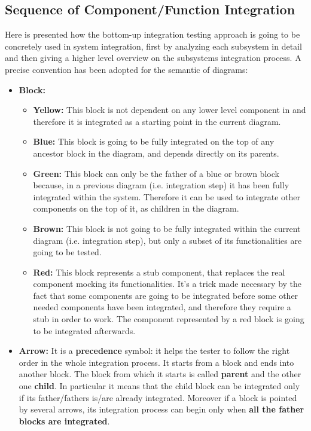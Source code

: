 \subsection{Sequence of Component/Function Integration}
Here is presented how the bottom-up integration testing approach is going to be concretely used in \myTaxiService{} system integration, first by analyzing each subsystem in detail and then giving a higher level overview on the subsystems integration process.
A precise convention has been adopted for the semantic of diagrams:
\begin{itemize}
	\item
		\textbf{Block:}
		\begin{itemize}
			\item \textbf{Yellow:} This block is not dependent on any lower level component in \myTaxiService{} and therefore it is integrated as a starting point in the current diagram.
			\item \textbf{Blue:} This block is going to be fully integrated on the top of any ancestor block in the diagram, and depends directly on its parents.
			\item \textbf{Green:} This block can only be the father of a blue or brown block because, in a previous diagram (i.e. integration step) it has been fully integrated within the system.
			Therefore it can be used to integrate other components on the top of it, as children in the diagram.
			\item \textbf{Brown:} This block is not going to be fully integrated within the current diagram (i.e. integration step), but only a subset of its functionalities are going to be tested.
			\item \textbf{Red:} This block represents a stub component, that replaces the real component mocking its functionalities.
			It's a trick made necessary by the fact that some components are going to be integrated before some other needed components have been integrated, and therefore they require a stub in order to work.
			The component represented by a red block is going to be integrated afterwards.
		\end{itemize}
	\item
		\textbf{Arrow:} It is a \textbf{precedence} symbol: it helps the tester to follow the right order in the whole integration process. It starts from a block and ends into another block. The block from which it starts is called \textbf{parent} and the other one \textbf{child}. In particular it means that the child block can be integrated only if its father/fathers is/are already integrated. Moreover if a block is pointed by several arrows, its integration process can begin only when \textbf{all the father blocks are integrated}.
\end{itemize}

